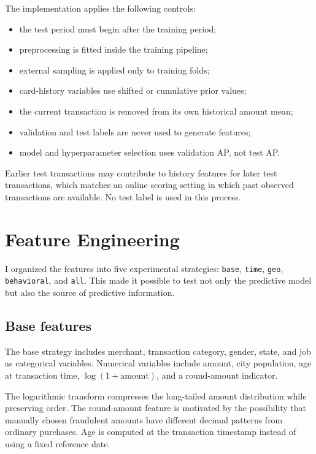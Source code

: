 \documentclass[11pt,a4paper]{article}
\newcommand{\code}[1]{\texttt{#1}}
\begin{document}
The implementation applies the following controls:
\begin{itemize}
    \item the test period must begin after the training period;
    \item preprocessing is fitted inside the training pipeline;
    \item external sampling is applied only to training folds;
    \item card-history variables use shifted or cumulative prior values;
    \item the current transaction is removed from its own historical amount mean;
    \item validation and test labels are never used to generate features;
    \item model and hyperparameter selection uses validation AP, not test AP.
\end{itemize}

Earlier test transactions may contribute to history features for later test transactions, which matches an online scoring setting in which past observed transactions are available. No test label is used in this process.

\section{Feature Engineering}

I organized the features into five experimental strategies: \code{base}, \code{time}, \code{geo}, \code{behavioral}, and \code{all}. This made it possible to test not only the predictive model but also the source of predictive information.

\subsection{Base features}

The base strategy includes merchant, transaction category, gender, state, and job as categorical variables. Numerical variables include amount, city population, age at transaction time, $\log(1+\mathrm{amount})$, and a round-amount indicator.

The logarithmic transform compresses the long-tailed amount distribution while preserving order. The round-amount feature is motivated by the possibility that manually chosen fraudulent amounts have different decimal patterns from ordinary purchases. Age is computed at the transaction timestamp instead of using a fixed reference date.
\end{document}
